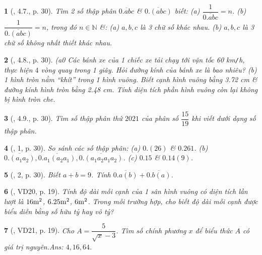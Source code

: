 \documentclass{article}
\newtheorem{baitoan}{}
\begin{document}
\begin{baitoan}[\cite{Binh_boi_duong_Toan_7_tap_1}, 4.7., p. 30]
	Tìm 2 số thập phân $\overline{0.abc}$ \& $\overline{0.(abc)}$ biết: (a) $\dfrac{1}{\overline{0.abc}} = n$. (b) $\dfrac{1}{\overline{0.(abc)}} = n$, trong đó $n\in\mathbb{N}$ \&: (a) $a,b,c$ là 3 chữ số khác nhau. (b) $a,b,c$ là 3 chữ số không nhất thiết khác nhau.
\end{baitoan}

\begin{baitoan}[\cite{Binh_boi_duong_Toan_7_tap_1}, 4.8., p. 30]
	(a0 Các bánh xe của 1 chiếc xe tải chạy tới vận tốc {\rm60 km{\tt/}h}, thực hiện $4$ vòng quay trong 1 giây. Hỏi đường kính của bánh xe là bao nhiêu? (b) 1 hình tròn nằm ``khít'' trong 1 hình vuông. Biết cạnh hình vuông bằng {\rm3.72 cm} \& đường kính hình tròn bằng {\rm2.48 cm}. Tính diện tích phần hình vuông còn lại không bị hình tròn che.
\end{baitoan}

\begin{baitoan}[\cite{Binh_boi_duong_Toan_7_tap_1}, 4.9., p. 30]
	Tìm số thập phân thứ $2021$ của phân số $\dfrac{15}{19}$ khi viết dưới dạng số thập phân.
\end{baitoan}

\begin{baitoan}[\cite{Binh_boi_duong_Toan_7_tap_1}, 1, p. 30]
	So sánh các số thập phân: (a) $0.(26)$ \& $0.261$. (b) $\overline{0.(a_1a_2)},\overline{0.a_1(a_2a_1)},\overline{0.(a_1a_2a_1a_2)}$. (c) $0.15$ \& $0.14(9)$.
\end{baitoan}

\begin{baitoan}[\cite{Binh_boi_duong_Toan_7_tap_1}, 2, p. 30]
	Biết $a + b = 9$. Tính $\overline{0.a(b)} + \overline{0.b(a)}$.
\end{baitoan}

\begin{baitoan}[\cite{Tuyen_Toan_7}, VD20, p. 19]
	Tính độ dài mỗi cạnh của 1 sân hình vuông có diện tích lần lượt là $\rm16m^2$, $\rm6.25m^2$, $\rm6m^2$. Trong mỗi trường hợp, cho biết độ dài mỗi cạnh được biểu diễn bằng số hữu tỷ hay vô tỷ?
\end{baitoan}

\begin{baitoan}[\cite{Tuyen_Toan_7}, VD21, p. 19]
	Cho $A = \dfrac{5}{\sqrt{x} - 3}$. Tìm số chính phương $x$ để biểu thức $A$ có giá trị nguyên.\hfill{\sf Ans:} $4,16,64$.
\end{baitoan}
\end{document}
